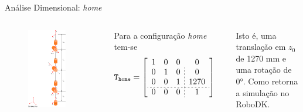 \documentclass[aspectratio=169]{beamer}
\begin{document}
\begin{frame}{Análise Dimensional: \textit{home}}
\begin{columns}

\begin{figure}[h]
    \centering
    \includegraphics[width=0.75\textwidth,left]{Fig/validacao_home.eps}
\end{figure}

Para a configuração \textit{home} tem-se
\begin{align*}
    \mathtt{T}_\mathtt{home}
    &=
    \left[
    \begin{array}{ccc;{2pt/2pt}c}
        1 & 0 & 0 & 0 \\
        0 & 1 & 0 & 0 \\
        0 & 0 & 1 & 1270 \\
        \hdashline[2pt/2pt]
        0 & 0 & 0 & 1
    \end{array}
    \right]
\end{align*}

Isto é, uma translação em $z_0$ de 1270 mm e uma rotação de \ang{0}. Como retorna a simulação no RoboDK.

\end{columns}

\end{frame}
\end{document}

